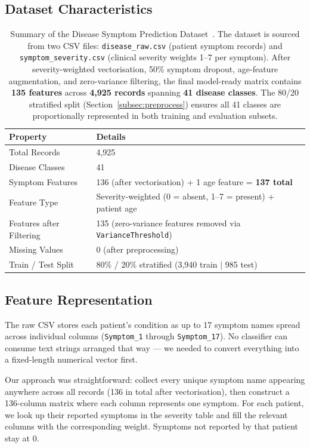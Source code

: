 \documentclass[12pt,a4paper]{article}
\begin{document}
\subsection{Dataset Characteristics}

\begin{table}[H]
\centering
\caption{Summary of the Disease Symptom Prediction Dataset~\cite{itachi2020}. The dataset is
sourced from two CSV files: \texttt{disease\_raw.csv} (patient symptom records) and
\texttt{symptom\_severity.csv} (clinical severity weights 1--7 per symptom). After
severity-weighted vectorisation, 50\% symptom dropout, age-feature augmentation, and
zero-variance filtering, the final model-ready matrix contains \textbf{135 features} across
\textbf{4,925 records} spanning \textbf{41 disease classes}. The 80/20 stratified split
(Section~\ref{subsec:preprocess}) ensures all 41 classes are proportionally represented
in both training and evaluation subsets.}
\label{tab:dataset}
\begin{tabular}{ll}
\toprule
\textbf{Property} & \textbf{Details} \\
\midrule
Total Records       & 4,925 \\
Disease Classes     & 41 \\
Symptom Features    & 136 (after vectorisation) + 1 age feature = \textbf{137 total} \\
Feature Type        & Severity-weighted (0 = absent, 1--7 = present) + patient age \\
Features after Filtering & 135 (zero-variance features removed via \texttt{VarianceThreshold}) \\
Missing Values      & 0 (after preprocessing) \\
Train / Test Split  & 80\% / 20\% stratified (3,940 train $|$ 985 test) \\
\bottomrule
\end{tabular}
\end{table}

\subsection{Feature Representation}
The raw CSV stores each patient's condition as up to 17 symptom names spread across individual columns (\texttt{Symptom\_1} through \texttt{Symptom\_17}). No classifier can consume text strings arranged that way --- we needed to convert everything into a fixed-length numerical vector first.

Our approach was straightforward: collect every unique symptom name appearing anywhere across all records (136 in total after vectorisation), then construct a 136-column matrix where each column represents one symptom. For each patient, we look up their reported symptoms in the severity table and fill the relevant columns with the corresponding weight. Symptoms not reported by that patient stay at 0.
\end{document}
